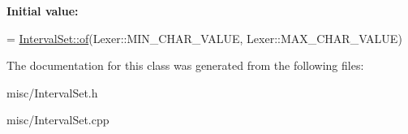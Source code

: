 {\bfseries Initial value\+:}
\begin{DoxyCode}
= 
    \hyperlink{classantlr4_1_1misc_1_1IntervalSet_ad7b2791799066867e684ab8a69b78fb7}{IntervalSet::of}(Lexer::MIN\_CHAR\_VALUE, Lexer::MAX\_CHAR\_VALUE)
\end{DoxyCode}


The documentation for this class was generated from the following files\+:\begin{DoxyCompactItemize}
\item 
misc/Interval\+Set.\+h\item 
misc/Interval\+Set.\+cpp\end{DoxyCompactItemize}
